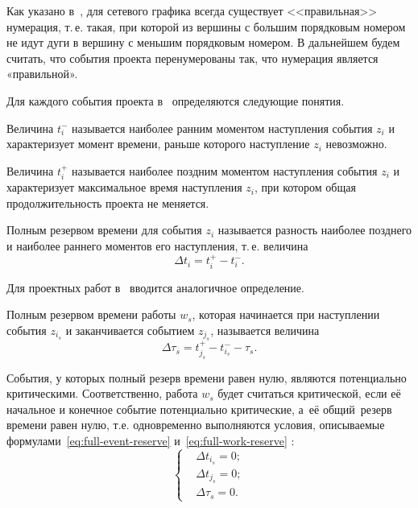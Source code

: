 Как указано в~\cite{Balashov_IPU, Graph_Redbook}, для сетевого графика всегда существует <<правильная>> нумерация, т.\,е. такая, при которой из вершины с большим порядковым номером не идут дуги в вершину с меньшим порядковым номером. В дальнейшем будем считать, что события проекта перенумерованы так, что нумерация является «правильной».

Для каждого события проекта в~\cite{Eddous, Taha_Operation_Research, Balashov_IPU, Burkov} определяются следующие понятия.
\begin{mydef}
  Величина $t_{i}^{-}$ называется наиболее ранним моментом наступления события $z_i$ и характеризует момент времени, раньше которого наступление $z_i$ невозможно.
\end{mydef}

\begin{mydef}
  Величина $t_{i}^{+}$ называется наиболее поздним моментом наступления события $z_i$ и характеризует максимальное время наступления $z_i$, при котором общая продолжительность проекта не меняется.
\end{mydef}

\begin{mydef}
  Полным резервом времени для события $z_i$ называется разность наиболее позднего и наиболее раннего моментов его наступления, т.\,е. величина
\begin{equation}
\label{eq:full-event-reserve}
  \Delta t_i=t^+_i-t^-_i.
\end{equation}
\end{mydef}

Для проектных работ в~\cite{Eddous} вводится аналогичное определение.
\begin{mydef}
  Полным резервом времени работы $w_s$, которая начинается при наступлении события $z_{i_s}$ и заканчивается событием $z_{j_s}$, называется величина
\begin{equation}
\label{eq:full-work-reserve}
  \Delta \tau_s=t_{j_s}^{+}-t_{i_s}^{-}-\tau_s.
\end{equation}
\end{mydef}
	
События, у которых полный резерв времени равен нулю, являются потенциально критическими. Соответственно, работа $w_s$ будет считаться критической, если её начальное и конечное событие потенциально критические, а~её общий~резерв времени равен нулю, т.е. одновременно выполняются условия, описываемые формулами~\eqref{eq:full-event-reserve} и~\eqref{eq:full-work-reserve} \cite{Eddous}:
\begin{equation}
\label{eq:critical-work-def}
  \left\{ \begin{aligned}
    & \Delta t_{i_s}=0; \\ 
    & \Delta t_{j_s}=0; \\ 
    & \Delta \tau_s=0.
  \end{aligned} \right.
\end{equation}

